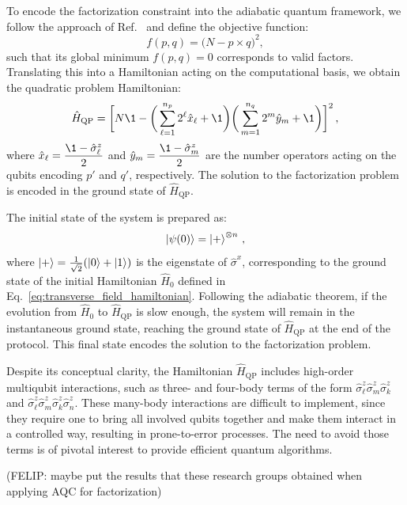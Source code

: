 To encode the factorization constraint into the adiabatic quantum framework, we follow
the approach of Ref.~\cite{hegade_digitized_2021} and define the objective function:
\begin{equation}
	f(p,q) = \big(N - p \times q \big)^2,
\end{equation}
such that its global minimum $f(p,q)=0$ corresponds to valid factors. Translating this
into a Hamiltonian acting on the computational basis, we obtain the quadratic problem Hamiltonian:
\begin{equation}
	\hat{H}_\mathrm{QP} = \bigg[ N \1 - \bigg( \sum_{\ell=1}^{n_p} 2^\ell \hat{x}_\ell + \1 \bigg)
	\bigg( \sum_{m=1}^{n_q} 2^m \hat{y}_m + \1 \bigg) \bigg]^2\,,
	\label{eq:quadratic_problem_hamiltonian}
\end{equation}
where $\hat{x}_\ell = \dfrac{\1 - \hat{\sigma}_\ell^z}{2}$ and $\hat{y}_m = \dfrac{\1 - \hat{\sigma}_m^z}{2}$
are the number operators acting on the qubits encoding $p'$ and $q'$, respectively. The solution
to the factorization problem is encoded in the ground state of $\hat{H}_\mathrm{QP}$.

The initial state of the system is prepared as:
\begin{equation}
	\ket{\psi(0)} = \ket{+}^{\otimes n}\,,
	\label{eq:initial_state}
\end{equation}
where $\ket{+} = \frac{1}{\sqrt{2}} (\ket{0} + \ket{1})$ is the eigenstate of $\hat{\sigma}^x$,
corresponding to the ground state of the initial Hamiltonian $\hat{H}_0$ defined in Eq.~\ref{eq:transverse_field_hamiltonian}.
Following the adiabatic theorem, if the evolution from $\hat{H}_0$ to $\hat{H}_\mathrm{QP}$
is slow enough, the system will remain in the instantaneous ground state, reaching the ground state of
$\hat{H}_\mathrm{QP}$ at the end of the protocol. This final state encodes the solution to the factorization
problem.

Despite its conceptual clarity, the Hamiltonian $\hat{H}_\mathrm{QP}$ includes high-order
multiqubit interactions, such as three- and four-body terms of the form
$\hat{\sigma}_\ell^z \hat{\sigma}_m^z \hat{\sigma}_k^z$ and $\hat{\sigma}_\ell^z \hat{\sigma}_m^z
\hat{\sigma}_k^z \hat{\sigma}_n^z$.
These many-body interactions are difficult to implement, since they require one to bring
all involved qubits together and make them interact in a controlled way, resulting in
prone-to-error processes. The need to avoid those terms is of pivotal interest to provide
efficient quantum algorithms.

{\color{red} (FELIP: maybe put the results that these research groups obtained when applying AQC for factorization)}

